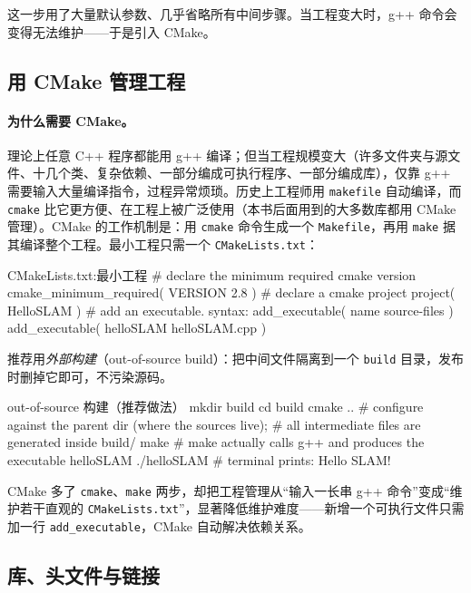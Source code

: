 \noindent 这一步用了大量默认参数、几乎省略所有中间步骤。当工程变大时，g++ 命令会变得无法维护——于是引入 CMake。

\subsection{用 CMake 管理工程}
\label{sec:intro-cmake}
\paragraph{为什么需要 CMake。}
理论上任意 C++ 程序都能用 g++ 编译；但当工程规模变大（许多文件夹与源文件、十几个类、复杂依赖、一部分编成可执行程序、一部分编成库），仅靠 g++ 需要输入大量编译指令，过程异常烦琐。历史上工程师用 \texttt{makefile} 自动编译，而 \texttt{cmake} 比它更方便、在工程上被广泛使用（本书后面用到的大多数库都用 CMake 管理）。CMake 的工作机制是：用 \texttt{cmake} 命令生成一个 \texttt{Makefile}，再用 \texttt{make} 据其编译整个工程。最小工程只需一个 \texttt{CMakeLists.\allowbreak txt}：

\begin{codebox}[text]{CMakeLists.txt:最小工程}
# declare the minimum required cmake version
cmake_minimum_required( VERSION 2.8 )
# declare a cmake project
project( HelloSLAM )
# add an executable.  syntax: add_executable( name source-files )
add_executable( helloSLAM helloSLAM.cpp )
\end{codebox}

\noindent 推荐用\emph{外部构建}（out-of-source build）：把中间文件隔离到一个 \texttt{build} 目录，发布时删掉它即可，不污染源码。

\begin{codebox}[bash]{out-of-source 构建（推荐做法）}
mkdir build
cd build
cmake ..     # configure against the parent dir (where the sources live);
             # all intermediate files are generated inside build/
make         # make actually calls g++ and produces the executable helloSLAM
./helloSLAM  # terminal prints: Hello SLAM!
\end{codebox}

\noindent CMake 多了 \texttt{cmake}、\texttt{make} 两步，却把工程管理从“输入一长串 g++ 命令”变成“维护若干直观的 \texttt{CMakeLists.\allowbreak txt}”，显著降低维护难度——新增一个可执行文件只需加一行 \texttt{add\_executable}，CMake 自动解决依赖关系。

\subsection{库、头文件与链接}
\label{sec:intro-lib}
